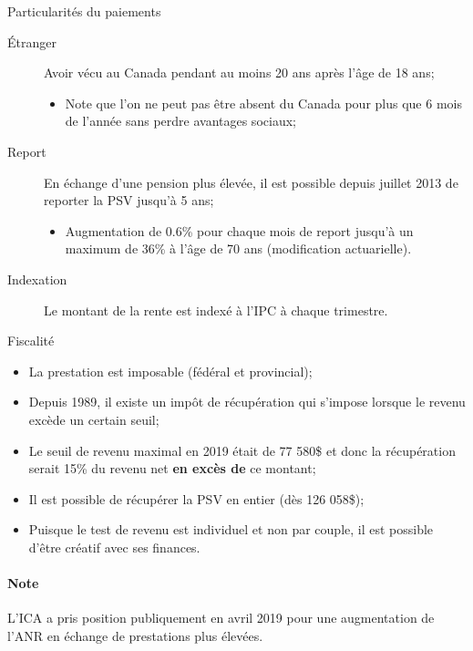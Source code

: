 \documentclass[10pt, french]{article}
\begin{document}
\begin{multicols*}{3}
\begin{conceptgen}{Particularités du paiements}
\begin{description}
	\item[Étranger]	Avoir vécu au Canada pendant au moins 20 ans après l'âge de 18 ans;
		\begin{itemize}[leftmargin = *]
		\item	Note que l'on ne peut pas être absent du Canada pour plus que 6 mois de l'année sans perdre avantages sociaux;
		\end{itemize}
	\item[Report]	En échange d'une pension plus élevée, il est possible depuis juillet 2013 de reporter la PSV jusqu'à 5 ans;
		\begin{itemize}[leftmargin = *]
		\item	Augmentation de 0.6\% pour chaque mois de report jusqu'à un maximum de 36\% à l'âge de 70 ans (modification actuarielle).
		\end{itemize}
	\item[Indexation]	Le montant de la rente est indexé à l'IPC à chaque trimestre.
\end{description}
\end{conceptgen}

\begin{conceptgen}{Fiscalité}
\begin{itemize}[leftmargin = *]
	\item	La prestation est imposable (fédéral et provincial);
	\item	Depuis 1989, il existe un impôt de récupération qui s'impose lorsque le revenu excède un certain seuil;
	\item	Le seuil de revenu maximal en 2019 était de 77 580\$ et donc la récupération serait 15\% du revenu net \textbf{en excès de} ce montant;
	\item	Il est possible de récupérer la PSV en entier (dès 126 058\$);
	\item	Puisque le test de revenu est individuel et non par couple, il est possible d'être créatif avec ses finances.
\end{itemize}
\end{conceptgen}

\paragraph{Note} L'ICA a pris position publiquement en avril 2019 pour une augmentation de l'ANR en échange de prestations plus élevées.


\end{multicols*}
\end{document}
